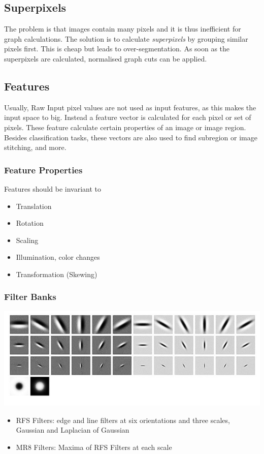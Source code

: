 \documentclass[11pt]{article}
\theoremstyle{definition}
\begin{document}
\subsection{Superpixels}
The problem is that images contain many pixels and it is thus inefficient for graph calculations. The solution is to calculate \emph{superpixels} by grouping similar pixels first. This is cheap but leads to over-segmentation. As soon as the superpixels are calculated, normalised graph cuts can be applied.

\subsection{Features}
Usually, Raw Input pixel values are not used as input features, as this makes the input space to big. Instead a feature vector is calculated for each pixel or set of pixels. These feature calculate certain properties of an image or image region. Besides classification tasks, these vectors are also used to find subregion or image stitching, and more.

\subsubsection{Feature Properties}
Features should be invariant to
\begin{itemize}[label=-]
	\item Translation
	\item Rotation
	\item Scaling
	\item Illumination, color changes
	\item Transformation (Skewing)
\end{itemize}

\subsubsection{Filter Banks}
\begin{center}
	\includegraphics[width=0.6\linewidth]{img/filter_bank}
\end{center}
\begin{itemize}
	\item RFS Filters: edge and line filters at six orientations and three scales, Gaussian and Laplacian of Gaussian
	\item MR8 Filters: Maxima of RFS Filters at each scale
\end{itemize}
\end{document}

